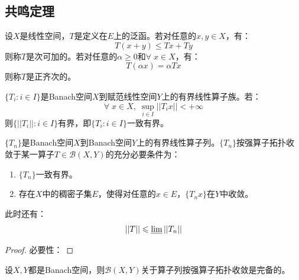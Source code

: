 \subsection{共鸣定理}
\begin{definition}
	设$X$是线性空间，$T$是定义在$E$上的泛函。若对任意的$x,y\in X$，有：
	\begin{equation*}
		T(x+y)\leqslant Tx+Ty
	\end{equation*}
	则称$T$是次可加的。若对任意的$\alpha\geqslant0$和$\forall\;x\in X$，有：
	\begin{equation*}
		T(\alpha x)=\alpha Tx
	\end{equation*}
	则称$T$是正齐次的。
\end{definition}
\begin{theorem}
	$\{T_i:i\in I\}$是Banach空间$X$到赋范线性空间$Y$上的有界线性算子族。若：
	\begin{equation*}
		\forall\;x\in X,\;\sup_{i\in I}||T_ix||<+\infty
	\end{equation*}
	则$\{||T_i||:i\in I\}$有界，即$\{T_i:i\in I\}$一致有界。
\end{theorem}
\begin{theorem}
	$\{T_n\}$是Banach空间$X$到Banach空间$Y$上的有界线性算子列。$\{T_n\}$按强算子拓扑收敛于某一算子$T\in\mathscr{B}(X,Y)$的充分必要条件为：
	\begin{enumerate}
		\item $\{T_n\}$一致有界。
		\item 存在$X$中的稠密子集$E$，使得对任意的$x\in E$，$\{T_nx\}$在$Y$中收敛。
	\end{enumerate}
	此时还有：
	\begin{equation*}
		||T||\leqslant\varliminf||T_n||
	\end{equation*}
\end{theorem}
\begin{proof}
	必要性：
\end{proof}
\begin{theorem}
	设$X,Y$都是Banach空间，则$\mathscr{B}(X,Y)$关于算子列按强算子拓扑收敛是完备的。
\end{theorem}